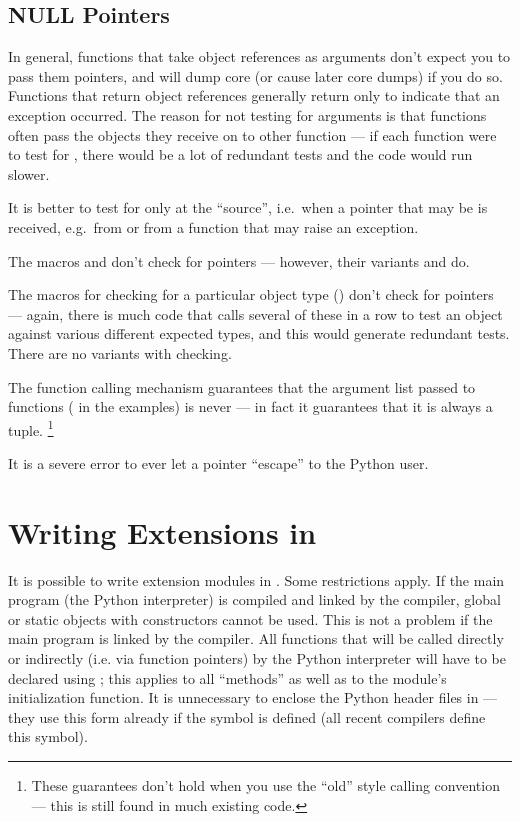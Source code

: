 \documentclass[twoside,openright]{report}
\begin{document}
\subsection{NULL Pointers}

In general, functions that take object references as arguments don't
expect you to pass them \NULL{} pointers, and will dump core (or
cause later core dumps) if you do so.  Functions that return object
references generally return \NULL{} only to indicate that an
exception occurred.  The reason for not testing for \NULL{}
arguments is that functions often pass the objects they receive on to
other function --- if each function were to test for \NULL{},
there would be a lot of redundant tests and the code would run slower.

It is better to test for \NULL{} only at the ``source'', i.e.\
when a pointer that may be \NULL{} is received, e.g.\ from
 or from a function that may raise an exception.

The macros  and 
don't check for \NULL{} pointers --- however, their variants
 and  do.

The macros for checking for a particular object type
() don't check for \NULL{} pointers ---
again, there is much code that calls several of these in a row to test
an object against various different expected types, and this would
generate redundant tests.  There are no variants with \NULL{}
checking.

The \C{} function calling mechanism guarantees that the argument list
passed to \C{} functions (\code{args} in the examples) is never
\NULL{} --- in fact it guarantees that it is always a tuple.%
\footnote{These guarantees don't hold when you use the ``old'' style
calling convention --- this is still found in much existing code.}

It is a severe error to ever let a \NULL{} pointer ``escape'' to
the Python user.  


\section{Writing Extensions in \Cpp{}}

It is possible to write extension modules in \Cpp{}.  Some restrictions
apply.  If the main program (the Python interpreter) is compiled and
linked by the \C{} compiler, global or static objects with constructors
cannot be used.  This is not a problem if the main program is linked
by the \Cpp{} compiler.  All functions that will be called directly or
indirectly (i.e. via function pointers) by the Python interpreter will
have to be declared using \code{extern "C"}; this applies to all
``methods'' as well as to the module's initialization function.
It is unnecessary to enclose the Python header files in
 --- they use this form already if the symbol
\samp{__cplusplus} is defined (all recent \Cpp{} compilers define this
symbol).
\end{document}

